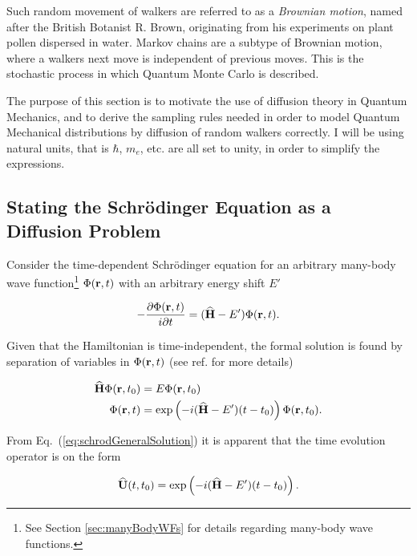 Such random movement of walkers are referred to as a \textit{Brownian motion}, named after the British Botanist R. Brown, originating from his experiments on plant pollen dispersed in water. Markov chains are a subtype of Brownian motion, where a walkers next move is independent of previous moves. This is the stochastic process in which Quantum Monte Carlo is described.

The purpose of this section is to motivate the use of diffusion theory in Quantum Mechanics, and to derive the sampling rules needed in order to model Quantum Mechanical distributions by diffusion of random walkers correctly. I will be using natural units, that is $\hbar$, $m_e$, etc. are all set to unity, in order to simplify the expressions.

\subsection{Stating the Schrödinger Equation as a Diffusion Problem}
\label{sec:statingDiff}

Consider the time-dependent Schrödinger equation for an arbitrary many-body wave function\footnote{See Section \ref{sec:manyBodyWFs} for details regarding many-body wave functions.} $\Phi(\mathbf{r}, t)$ with an arbitrary energy shift $E'$

\begin{equation}
 -\frac{\partial \Phi(\mathbf{r}, t)}{i\partial t} = ({\bf\widehat{H}} - E')\Phi(\mathbf{r}, t).
\end{equation}

Given that the Hamiltonian is time-independent, the formal solution is found by separation of variables in $\Phi(\mathbf{r}, t)$ (see ref. \cite{griffiths} for more details)

\begin{align}
 {\bf\widehat{H}}\Phi(\mathbf{r}, t_0) &= E\Phi(\mathbf{r}, t_0) \label{eq:schrodTimeIndie}\\
 \Phi(\mathbf{r}, t) &= \exp\left(-i({\bf\widehat{H}} - E')(t-t_0)\right)\Phi(\mathbf{r}, t_0). \label{eq:schrodGeneralSolution}
\end{align}

From Eq.~(\ref{eq:schrodGeneralSolution}) it is apparent that the time evolution operator is on the form

\begin{equation}
 {\bf\widehat{U}}(t, t_0) = \exp\left(-i({\bf\widehat{H}} - E')(t-t_0)\right). \label{eq:TimeEvolOp}
\end{equation}

% 

